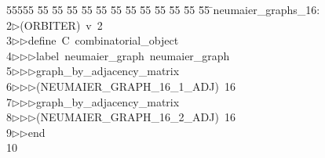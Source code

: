 %
%
\begin{tabbing}
55555 \= 55 \= 55 \= 55 \= 55 \= 55 \= 55 \= 55 \= 55 \= 55 \= 55 \= 55 \= 55 \= \>neumaier\_graphs\_16:\\[0pt]
2\>$\triangleright$\>(ORBITER)\ v\ 2\ \\[0pt]
3\>$\triangleright$\>$\triangleright$\>define\ C\ combinatorial\_object\ \\[0pt]
4\>$\triangleright$\>$\triangleright$\>$\triangleright$\>label\ neumaier\_graph\ neumaier\_graph\ \\[0pt]
5\>$\triangleright$\>$\triangleright$\>$\triangleright$\>graph\_by\_adjacency\_matrix\ \\[0pt]
6\>$\triangleright$\>$\triangleright$\>$\triangleright$\>(NEUMAIER\_GRAPH\_16\_1\_ADJ)\ 16\ \\[0pt]
7\>$\triangleright$\>$\triangleright$\>$\triangleright$\>graph\_by\_adjacency\_matrix\ \\[0pt]
8\>$\triangleright$\>$\triangleright$\>$\triangleright$\>(NEUMAIER\_GRAPH\_16\_2\_ADJ)\ 16\ \\[0pt]
9\>$\triangleright$\>$\triangleright$\>end\\[0pt]
10\>\end{tabbing}
